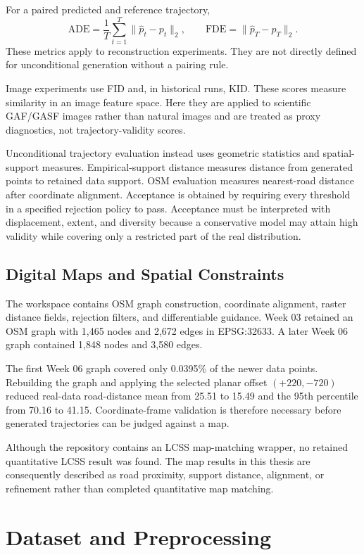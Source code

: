 \documentclass[12pt,a4paper,oneside]{report}
\begin{document}
For a paired predicted and reference trajectory,
\[
\mathrm{ADE}=\frac{1}{T}\sum_{t=1}^{T}\|\hat p_t-p_t\|_2,
\qquad
\mathrm{FDE}=\|\hat p_T-p_T\|_2.
\]
These metrics apply to reconstruction experiments. They are not directly defined for unconditional generation without a pairing rule.

Image experiments use FID and, in historical runs, KID. These scores measure similarity in an image feature space. Here they are applied to scientific GAF/GASF images rather than natural images and are treated as proxy diagnostics, not trajectory-validity scores.

Unconditional trajectory evaluation instead uses geometric statistics and spatial-support measures. Empirical-support distance measures distance from generated points to retained data support. OSM evaluation measures nearest-road distance after coordinate alignment. Acceptance is obtained by requiring every threshold in a specified rejection policy to pass. Acceptance must be interpreted with displacement, extent, and diversity because a conservative model may attain high validity while covering only a restricted part of the real distribution.

\section{Digital Maps and Spatial Constraints}

The workspace contains OSM graph construction, coordinate alignment, raster distance fields, rejection filters, and differentiable guidance. Week 03 retained an OSM graph with 1,465 nodes and 2,672 edges in EPSG:32633. A later Week 06 graph contained 1,848 nodes and 3,580 edges.

The first Week 06 graph covered only 0.0395\% of the newer data points. Rebuilding the graph and applying the selected planar offset $(+220,-720)$ reduced real-data road-distance mean from 25.51 to 15.49 and the 95th percentile from 70.16 to 41.15. Coordinate-frame validation is therefore necessary before generated trajectories can be judged against a map.

Although the repository contains an LCSS map-matching wrapper, no retained quantitative LCSS result was found. The map results in this thesis are consequently described as road proximity, support distance, alignment, or refinement rather than completed quantitative map matching.

\chapter{Dataset and Preprocessing}
\label{chap:data}
\end{document}
